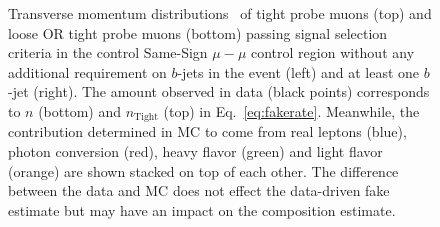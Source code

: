\begin{figure}[h!]
{}
\vspace{-10mm}\caption{Transverse momentum distributions \pt\ of tight probe muons (top) and loose OR tight probe muons (bottom) passing signal selection criteria in the control Same-Sign $\mu-\mu$ control region without any additional requirement on $b$-jets in the event (left) and at least one $b$-jet (right). 
The amount observed in data (black points) corresponds to $n$ (bottom) and $n_{\textrm{Tight}}$ (top) in Eq.~\ref{eq:fakerate}. 
Meanwhile, the contribution determined in MC to come from real leptons (blue), photon conversion (red), heavy flavor (green) and light
flavor (orange) are shown stacked on top of each other. 
The difference between the data and MC does not effect the data-driven
fake estimate but may have an impact on the composition estimate.
}
\label{fig:fakeEff_CRs_muon_stacked}
\end{figure}

